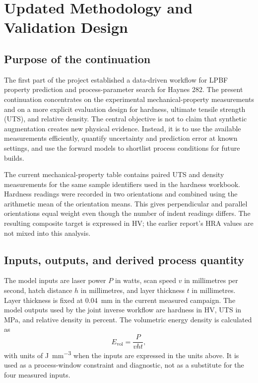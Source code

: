 \documentclass[12pt,a4paper,oneside]{report}
\newcommand{\VED}{\ensuremath{E_{\mathrm{vol}}}}
\begin{document}

\setcounter{chapter}{2}
\tableofcontents
\clearpage


\setcounter{page}{13}

\chapter{Updated Methodology and Validation Design}

\section{Purpose of the continuation}
The first part of the project established a data-driven workflow for LPBF property prediction and process-parameter search for Haynes 282. The present continuation concentrates on the experimental mechanical-property measurements and on a more explicit evaluation design for hardness, ultimate tensile strength (UTS), and relative density. The central objective is not to claim that synthetic augmentation creates new physical evidence. Instead, it is to use the available measurements efficiently, quantify uncertainty and prediction error at known settings, and use the forward models to shortlist process conditions for future builds.

The current mechanical-property table contains paired UTS and density measurements for the same sample identifiers used in the hardness workbook. Hardness readings were recorded in two orientations and combined using the arithmetic mean of the orientation means. This gives perpendicular and parallel orientations equal weight even though the number of indent readings differs. The resulting composite target is expressed in HV; the earlier report's HRA values are not mixed into this analysis.

\section{Inputs, outputs, and derived process quantity}
The model inputs are laser power $P$ in watts, scan speed $v$ in millimetres per second, hatch distance $h$ in millimetres, and layer thickness $t$ in millimetres. Layer thickness is fixed at \SI{0.04}{mm} in the current measured campaign. The model outputs used by the joint inverse workflow are hardness in HV, UTS in MPa, and relative density in percent. The volumetric energy density is calculated as
\begin{equation}
  \VED = \frac{P}{v h t},
  \label{eq:ved}
\end{equation}
with units of \si{J.mm^{-3}} when the inputs are expressed in the units above. It is used as a process-window constraint and diagnostic, not as a substitute for the four measured inputs.
\end{document}
